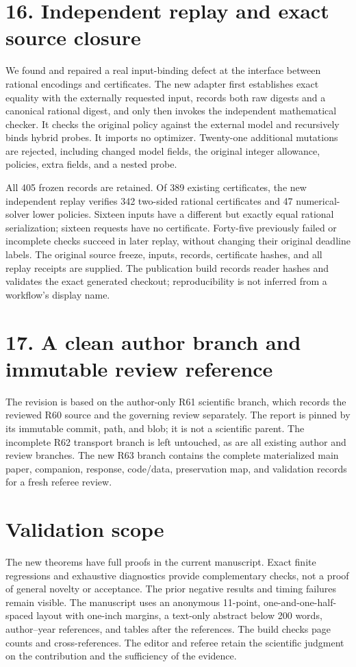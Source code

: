 \documentclass[11pt,letterpaper]{article}
\theoremstyle{definition}\newtheorem{remark}[theorem]{Remark}
\begin{document}
\section*{16. Independent replay and exact source closure}
We found and repaired a real input-binding defect at the interface between rational encodings and certificates. The new adapter first establishes exact equality with the externally requested input, records both raw digests and a canonical rational digest, and only then invokes the independent mathematical checker. It checks the original policy against the external model and recursively binds hybrid probes. It imports no optimizer. Twenty-one additional mutations are rejected, including changed model fields, the original integer allowance, policies, extra fields, and a nested probe.

All 405 frozen records are retained. Of 389 existing certificates, the new independent replay verifies 342 two-sided rational certificates and 47 numerical-solver lower policies. Sixteen inputs have a different but exactly equal rational serialization; sixteen requests have no certificate. Forty-five previously failed or incomplete checks succeed in later replay, without changing their original deadline labels. The original source freeze, inputs, records, certificate hashes, and all replay receipts are supplied. The publication build records reader hashes and validates the exact generated checkout; reproducibility is not inferred from a workflow's display name.

\section*{17. A clean author branch and immutable review reference}
The revision is based on the author-only R61 scientific branch, which records the reviewed R60 source and the governing review separately. The report is pinned by its immutable commit, path, and blob; it is not a scientific parent. The incomplete R62 transport branch is left untouched, as are all existing author and review branches. The new R63 branch contains the complete materialized main paper, companion, response, code/data, preservation map, and validation records for a fresh referee review.

\section*{Validation scope}
The new theorems have full proofs in the current manuscript. Exact finite regressions and exhaustive diagnostics provide complementary checks, not a proof of general novelty or acceptance. The prior negative results and timing failures remain visible. The manuscript uses an anonymous 11-point, one-and-one-half-spaced layout with one-inch margins, a text-only abstract below 200 words, author--year references, and tables after the references. The build checks page counts and cross-references. The editor and referee retain the scientific judgment on the contribution and the sufficiency of the evidence.
\end{document}
